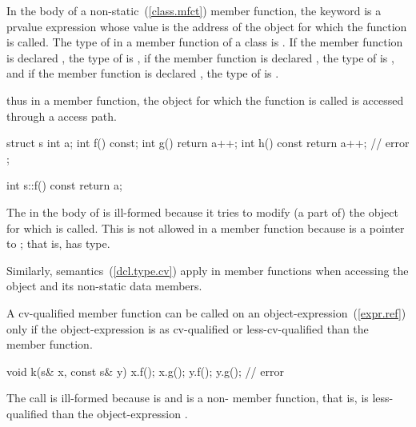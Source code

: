 \pnum
{}%
In the body of a non-static~(\ref{class.mfct}) member function, the
keyword  is a prvalue expression whose value is the
address of the object for which the function is called.
%
The type of  in a member function of a class  is
.
%
If the member function is declared , the type of
 is  ,
%
if the member function is declared , the type of
 is  , and if the member function
is declared  , the type of  is
  .
%
\begin{note} thus in a  member function, the object for which the function is
called is accessed through a  access path. \end{note}
\begin{example}

\begin{codeblock}
struct s {
  int a;
  int f() const;
  int g() { return a++; }
  int h() const { return a++; } // error
};

int s::f() const { return a; }
\end{codeblock}

The  in the body of  is ill-formed because it
tries to modify (a part of) the object for which  is
called. This is not allowed in a  member function because
 is a pointer to ; that is,  has
 type.
\end{example}

\pnum
Similarly,  semantics~(\ref{dcl.type.cv}) apply in
 member functions when accessing the object and its
non-static data members.

\pnum
A cv-qualified member function can be called on an
object-expression~(\ref{expr.ref}) only if the object-expression is as
cv-qualified or less-cv-qualified than the member function.
\begin{example}

\begin{codeblock}
void k(s& x, const s& y) {
  x.f();
  x.g();
  y.f();
  y.g();                        // error
}
\end{codeblock}

The call  is ill-formed because  is 
and  is a non- member function, that is,
 is less-qualified than the object-expression .
\end{example}

